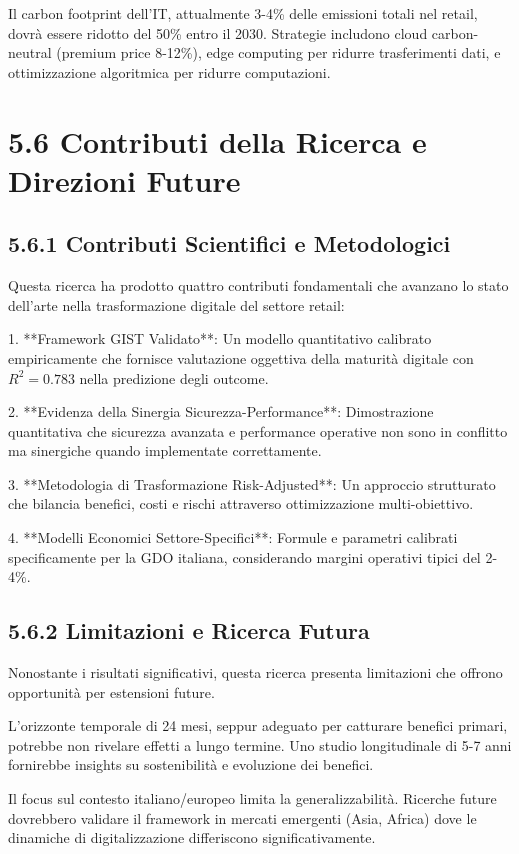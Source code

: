 Il carbon footprint dell'IT, attualmente 3-4\% delle emissioni totali nel retail, dovrà essere ridotto del 50\% entro il 2030. Strategie includono cloud carbon-neutral (premium price 8-12\%), edge computing per ridurre trasferimenti dati, e ottimizzazione algoritmica per ridurre computazioni.

\section{5.6 Contributi della Ricerca e Direzioni Future}

\subsection{5.6.1 Contributi Scientifici e Metodologici}

Questa ricerca ha prodotto quattro contributi fondamentali che avanzano lo stato dell'arte nella trasformazione digitale del settore retail:

1. **Framework GIST Validato**: Un modello quantitativo calibrato empiricamente che fornisce valutazione oggettiva della maturità digitale con $R^2 = 0.783$ nella predizione degli outcome.

2. **Evidenza della Sinergia Sicurezza-Performance**: Dimostrazione quantitativa che sicurezza avanzata e performance operative non sono in conflitto ma sinergiche quando implementate correttamente.

3. **Metodologia di Trasformazione Risk-Adjusted**: Un approccio strutturato che bilancia benefici, costi e rischi attraverso ottimizzazione multi-obiettivo.

4. **Modelli Economici Settore-Specifici**: Formule e parametri calibrati specificamente per la GDO italiana, considerando margini operativi tipici del 2-4\%.

\subsection{5.6.2 Limitazioni e Ricerca Futura}

Nonostante i risultati significativi, questa ricerca presenta limitazioni che offrono opportunità per estensioni future.

L'orizzonte temporale di 24 mesi, seppur adeguato per catturare benefici primari, potrebbe non rivelare effetti a lungo termine. Uno studio longitudinale di 5-7 anni fornirebbe insights su sostenibilità e evoluzione dei benefici.

Il focus sul contesto italiano/europeo limita la generalizzabilità. Ricerche future dovrebbero validare il framework in mercati emergenti (Asia, Africa) dove le dinamiche di digitalizzazione differiscono significativamente.

